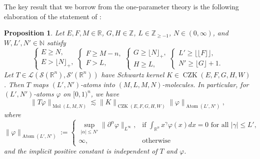 \documentclass[11pt, reqno]{amsart}
\newtheorem{proposition}[theorem]{Proposition}
\theoremstyle{definition}
\theoremstyle{remark}
\numberwithin{equation}{section}
\newcommand{\N}{\mathbb N}
\newcommand{\R}{\mathbb R}
\newcommand{\Z}{\mathbb Z}
\newcommand{\floor}[1]{\lfloor #1 \rfloor}
\newcommand{\Floor}[1]{\lfloor\!\lfloor #1 \rfloor\!\rfloor}
\newcommand{\abs}[1]{|#1|}
\newcommand{\Norm}[2]{\|#1\|_{#2}}
\begin{document}
The key result that we borrow from the one-parameter theory is the following elaboration of the statement of \cite[Proposition 6.19]{BHYY:1c}:

\begin{proposition}\label{prop:6.19}
Let $E,F,M\in\R$, $G,H\in\Z$, $L\in\Z_{\geq-1}$,
$N\in(0,\infty)$, and $W,L',N'\in\N$
satisfy
\begin{equation}\label{eq:6.19ass}
  \begin{cases} E\geq N, \\ E>\floor{N}_+,\end{cases}
  \begin{cases} F\geq M-n, \\ F> L,\end{cases}
  \begin{cases} G\geq \floor{N}_+, \\ H\geq L,\end{cases}
  \begin{cases} L'\geq \Floor{F}, \\ N'\geq \floor{G}+1.\end{cases}
\end{equation}
Let $T\in\mathcal L(\mathscr S(\R^n),\mathscr S'(\R^n))$ have Schwartz kernel $K\in\operatorname{CZK}(E,F,G,H,W)$. Then $T$ maps $(L',N')$-atoms into $(M,L,M,N)$-molecules. In particular, for $(L',N')$-atoms $\varphi$ on $[0,1)^n$, we have
\begin{equation}\label{eq:6.19}
  \Norm{T\varphi}{\operatorname{Mol}(L,M,N)}
  \lesssim\Norm{K}{\operatorname{CZK}(E,F,G,H,W)}\Norm{\varphi}{\operatorname{Atom}(L',N')},
\end{equation}
where
\begin{equation*}
  \Norm{\varphi}{\operatorname{Atom}(L',N')}
  :=\begin{cases}
    \sup_{\abs{\alpha}\leq N'}\Norm{\partial^\alpha\varphi}{L^\infty}, & \text{if }\int_{\R^n}x^\gamma\varphi(x)dx = 0
    \text{ for all }\abs{\gamma}\leq L', \\
    \infty, & \text{otherwise}\end{cases}
\end{equation*}
and the implicit positive constant is independent of $T$ and $\varphi$.
\end{proposition}
\end{document}
